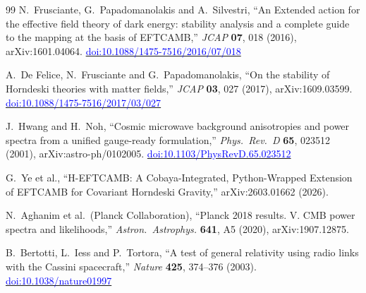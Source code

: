 \documentclass[11pt,a4paper]{article}
\newcommand{\doi}[1]{\href{https://doi.org/#1}{\textcolor{blue}{doi:#1}}}
\begin{document}
\begin{thebibliography}{99}
N.~Frusciante, G.~Papadomanolakis and A.~Silvestri,
``An Extended action for the effective field theory of dark energy: stability
analysis and a complete guide to the mapping at the basis of EFTCAMB,''
\emph{JCAP} \textbf{07}, 018 (2016), arXiv:1601.04064.
\doi{10.1088/1475-7516/2016/07/018}

A.~De Felice, N.~Frusciante and G.~Papadomanolakis,
``On the stability of Horndeski theories with matter fields,''
\emph{JCAP} \textbf{03}, 027 (2017), arXiv:1609.03599.
\doi{10.1088/1475-7516/2017/03/027}

J.~Hwang and H.~Noh,
``Cosmic microwave background anisotropies and power spectra from a unified
gauge-ready formulation,''
\emph{Phys.\ Rev.\ D} \textbf{65}, 023512 (2001), arXiv:astro-ph/0102005.
\doi{10.1103/PhysRevD.65.023512}

G.~Ye et al.,
``H-EFTCAMB: A Cobaya-Integrated, Python-Wrapped Extension of EFTCAMB for
Covariant Horndeski Gravity,'' arXiv:2603.01662 (2026).

N.~Aghanim et al.\ (Planck Collaboration),
``Planck 2018 results. V. CMB power spectra and likelihoods,''
\emph{Astron.\ Astrophys.} \textbf{641}, A5 (2020),
arXiv:1907.12875.

B.~Bertotti, L.~Iess and P.~Tortora,
``A test of general relativity using radio links with the Cassini spacecraft,''
\emph{Nature} \textbf{425}, 374--376 (2003).
\doi{10.1038/nature01997}




\end{thebibliography}
\end{document}
